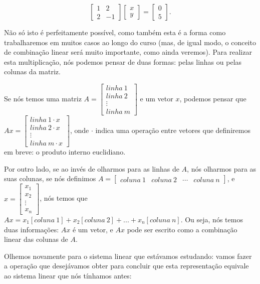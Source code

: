 $$
\begin{bmatrix}
	1 & 2 \\
	2 & -1
\end{bmatrix}
\begin{bmatrix}
	x \\
	y
\end{bmatrix} = 
\begin{bmatrix}
	0 \\
	5
\end{bmatrix}.
$$

Não só isto é perfeitamente possível, como também esta é a forma como trabalharemos em muitos casos ao longo do curso (mas, de igual modo, o conceito de combinação linear será muito importante, como ainda veremos). Para realizar esta multiplicação, nós podemos pensar de duas formas: pelas linhas ou pelas colunas da matriz.

Se nós temos uma matriz $A = \begin{bmatrix}
	linha~1 \\
	linha~2 \\
	\vdots \\
	linha~m
\end{bmatrix}$ e um vetor $x$, podemos pensar que $Ax = \begin{bmatrix}
	linha~1 \cdot x \\
	linha~2 \cdot x \\
	\vdots \\
	linha~m \cdot x
\end{bmatrix}$, onde $\cdot$ indica uma operação entre vetores que definiremos em breve: o produto interno euclidiano.

Por outro lado, se ao invés de olharmos para as linhas de $A$, nós olharmos para as suas colunas, se nós definimos $A = \begin{bmatrix} coluna~1 & coluna~2 & \cdots & coluna~n \end{bmatrix}$, e $x = \begin{bmatrix}
	x_1 \\
	x_2 \\
	\vdots \\
	x_n
\end{bmatrix}$, nós temos que $Ax = x_1[coluna~1] + x_2[coluna~2] + ... + x_n[coluna~n]$. Ou seja, nós temos duas informações: $Ax$ é um vetor, e $Ax$ pode ser escrito como a combinação linear das colunas de $A$.

Olhemos novamente para o sistema linear que estávamos estudando: vamos fazer a operação que desejávamos obter para concluir que esta representação equivale ao sistema linear que nós tínhamos antes:

